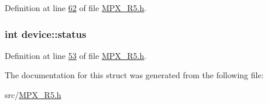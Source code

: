 Definition at line \hyperlink{_m_p_x___r5_8h_source_l00062}{62} of file \hyperlink{_m_p_x___r5_8h_source}{MPX\_\-R5.h}.

\hypertarget{structdevice_aaaefcdae0117d89bef5340a1e3f432e1}{
\subsubsection[{status}]{\setlength{\rightskip}{0pt plus 5cm}int {\bf device::status}}}
\label{structdevice_aaaefcdae0117d89bef5340a1e3f432e1}


Definition at line \hyperlink{_m_p_x___r5_8h_source_l00053}{53} of file \hyperlink{_m_p_x___r5_8h_source}{MPX\_\-R5.h}.



The documentation for this struct was generated from the following file:\begin{DoxyCompactItemize}
\item 
src/\hyperlink{_m_p_x___r5_8h}{MPX\_\-R5.h}\end{DoxyCompactItemize}
